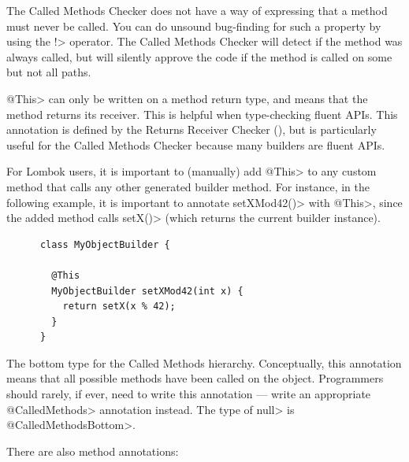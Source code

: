\begin{description}
  The Called Methods Checker does not have a way of expressing that a
  method must never be called.  You can do unsound bug-finding for such a
  property by using the \<!> operator.  The Called Methods Checker will
  detect if the method was always called, but will silently approve the code
  if the method is called on some but not all paths.

\item[\refqualclass{common/returnsreceiver/qual}{This}]
  \<@This> can only be written on a method return type, and means that the method returns its receiver.
  This is helpful when type-checking fluent APIs. This annotation is defined by the
  Returns Receiver Checker (), but is particularly useful
  for the Called Methods Checker because many builders are fluent APIs.

  For Lombok users, it is important to (manually) add \<@This> to any custom method that calls any other
  generated builder method. For instance, in the following example, it is important to annotate
  \<setXMod42()> with \<@This>, since the added method calls \<setX()> (which returns the current builder
  instance).

  \begin{Verbatim}
      class MyObjectBuilder {

        @This
        MyObjectBuilder setXMod42(int x) {
          return setX(x % 42);
        }
      }
  \end{Verbatim}

\item[\refqualclass{checker/calledmethods/qual}{CalledMethodsBottom}]
  The bottom type for the Called Methods hierarchy. Conceptually, this annotation
  means that all possible methods have been called on the object. Programmers should rarely,
  if ever, need to write this annotation --- write an appropriate \<@CalledMethods> annotation
  instead. The type of \<null> is \<@CalledMethodsBottom>.

\end{description}

There are also method annotations:

